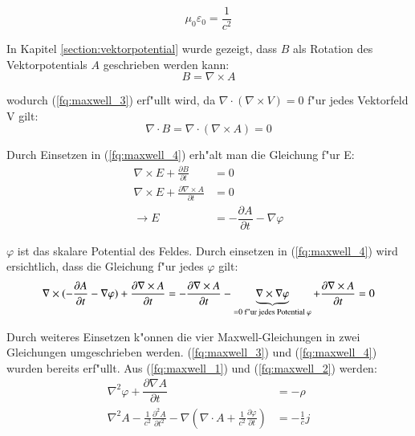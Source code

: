 \begin{equation*}
\mu_0\varepsilon_0=\frac{1}{c^2}
\end{equation*}

In Kapitel \ref{section:vektorpotential} wurde gezeigt, dass $B$ als Rotation des Vektorpotentials $A$ geschrieben werden kann:
\begin{equation*}
B = \nabla\times A 
\end{equation*}

wodurch (\ref{fq:maxwell_3}) erf"ullt wird, da $\nabla \cdot ( \nabla\times V ) = 0$ f"ur jedes Vektorfeld V gilt:
\begin{equation*}
\nabla \cdot B = \nabla \cdot ( \nabla\times A ) = 0
\end{equation*}

Durch Einsetzen in (\ref{fq:maxwell_4}) erh"alt man die Gleichung f"ur E:
\begin{equation*}
\begin{split}
\nabla\times E + \frac{\partial B }{\partial t} &= 0 \\
\nabla\times E + \frac{\partial \nabla\times A }{\partial t} &= 0 \\
\rightarrow E &= -\dfrac{\partial A}{\partial t} - \nabla \varphi
\end{split}
\end{equation*}

$\varphi$ ist das skalare Potential des Feldes. Durch einsetzen in (\ref{fq:maxwell_4}) wird ersichtlich, dass die Gleichung f"ur jedes $\varphi$ gilt:
\begin{equation*}
\nabla\times (-\dfrac{\partial A}{\partial t} - \nabla \varphi) + \frac{\partial \nabla\times A }{\partial t} = 
- \frac{\partial \nabla\times A }{\partial t} - \underbrace{\nabla\times \nabla \varphi}_{=0\text{ f"ur jedes Potential } \varphi} + \frac{\partial \nabla\times A }{\partial t} = 0\\
\end{equation*}

Durch weiteres Einsetzen k"onnen die vier Maxwell-Gleichungen in zwei Gleichungen umgeschrieben werden. (\ref{fq:maxwell_3}) und (\ref{fq:maxwell_4}) wurden bereits erf"ullt. Aus (\ref{fq:maxwell_1}) und (\ref{fq:maxwell_2}) werden:
\begin{align} 
 \label{fq:a_coupled_a}
 \nabla^2 \varphi + \dfrac{\partial \nabla A}{\partial t} &= -\rho \\
 \label{fq:a_coupled_b}
 \nabla^2 A - \frac{1}{c^2} \frac{\partial^2 A }{\partial t^2} - \nabla \left( \nabla \cdot A + \frac{1}{c^2} \frac{\partial \varphi }{\partial t} \right) &= - \frac{1}{c} j
\end{align}

